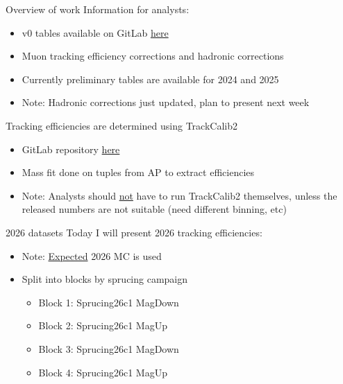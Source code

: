 \documentclass[xcolor={dvipsnames}]{beamer}
\begin{document}
\begin{frame}{Overview of work}
  \vspace{0.0cm}
  {Information for analysts:}
  \vspace{0.2cm}
  \begin{itemize}
    \setlength\itemsep{0.5em}
    \item{v0 tables available on GitLab \href{https://gitlab.cern.ch/lhcb-rta/tracking-efficiencies-run-3}{here}}
    \item{Muon tracking efficiency corrections and hadronic corrections}
    \item{Currently preliminary tables are available for 2024 and 2025}
    \item{Note: Hadronic corrections just updated, plan to present next week}
  \end{itemize}
  \vspace{0.5cm}
  {Tracking efficiencies are determined using TrackCalib2}
  \vspace{0.2cm}
  \begin{itemize}
    \setlength\itemsep{0.5em}
    \item{GitLab repository \href{https://gitlab.cern.ch/lhcb-rta/trackcalib2}{here}}
    \item{Mass fit done on tuples from AP to extract efficiencies}
    \item{Note: Analysts should \underline{not} have to run TrackCalib2 themselves, unless the released numbers are not suitable (need different binning, etc)}
  \end{itemize}
\end{frame}

\begin{frame}{2026 datasets}
  \vspace{0.0cm}
  {\large Today I will present 2026 tracking efficiencies:}
  \vspace{0.2cm}
  \begin{itemize}
    \setlength\itemsep{1.0em}
    \item{Note: \underline{Expected} 2026 MC is used}
    \item{Split into blocks by sprucing campaign}
    \begin{itemize}
      \item[-]{Block 1: Sprucing26c1 MagDown}
      \item[-]{Block 2: Sprucing26c1 MagUp}
      \item[-]{Block 3: Sprucing26c1 MagDown}
      \item[-]{Block 4: Sprucing26c1 MagUp}
    \end{itemize}
  \end{itemize}
\end{frame}
\end{document}
